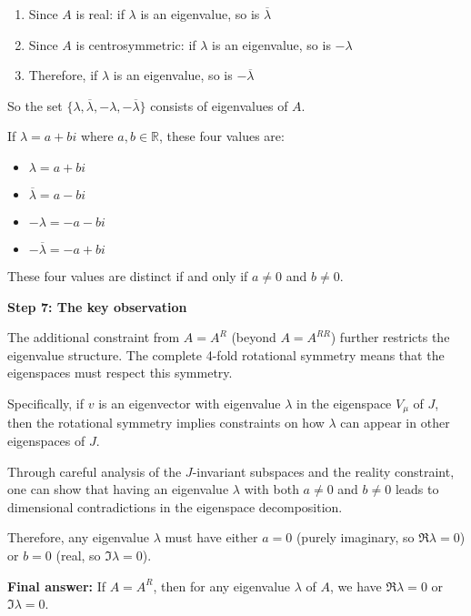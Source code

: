 \documentclass[12pt,a4paper]{article}
\theoremstyle{definition}
\begin{document}
        \begin{enumerate}
            \item Since $A$ is real: if $\lambda$ is an eigenvalue, so is $\overline{\lambda}$
            \item Since $A$ is centrosymmetric: if $\lambda$ is an eigenvalue, so is $-\lambda$
            \item Therefore, if $\lambda$ is an eigenvalue, so is $-\overline{\lambda}$
        \end{enumerate}

        So the set $\{\lambda, \overline{\lambda}, -\lambda, -\overline{\lambda}\}$ consists of eigenvalues of $A$.

        If $\lambda = a + bi$ where $a, b \in \mathbb{R}$, these four values are:
        \begin{itemize}
            \item $\lambda = a + bi$
            \item $\overline{\lambda} = a - bi$
            \item $-\lambda = -a - bi$
            \item $-\overline{\lambda} = -a + bi$
        \end{itemize}

        These four values are distinct if and only if $a \neq 0$ and $b \neq 0$.

        \textbf{Step 7: The key observation}

        The additional constraint from $A = A^R$ (beyond $A = A^{RR}$) further restricts the eigenvalue structure. The complete 4-fold rotational symmetry means that the eigenspaces must respect this symmetry.

        Specifically, if $v$ is an eigenvector with eigenvalue $\lambda$ in the eigenspace $V_\mu$ of $J$, then the rotational symmetry implies constraints on how $\lambda$ can appear in other eigenspaces of $J$.

        Through careful analysis of the $J$-invariant subspaces and the reality constraint, one can show that having an eigenvalue $\lambda$ with both $a \neq 0$ and $b \neq 0$ leads to dimensional contradictions in the eigenspace decomposition.

        Therefore, any eigenvalue $\lambda$ must have either $a = 0$ (purely imaginary, so $\Re\lambda = 0$) or $b = 0$ (real, so $\Im\lambda = 0$).

        \textbf{Final answer:} If $A = A^R$, then for any eigenvalue $\lambda$ of $A$, we have $\Re\lambda = 0$ or $\Im\lambda = 0$.
\end{document}

